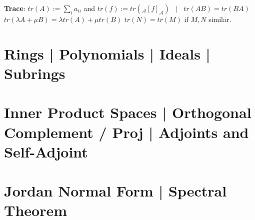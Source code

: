 \documentclass[9pt]{article}
\begin{document}
\textbf{Trace}: $tr(A):=\sum_{i}a_{ii}$ and $tr(f):=tr(_{\mathcal{A}}[f]_{\mathcal{A}})$ \ $\big|$ \ {\small $tr(AB)=tr(BA)$ \quad $tr(\lambda A+\mu B)=\lambda tr(A)+\mu tr(B)$ \quad $tr(N)=tr(M)$ if $M,N$ similar.}


\section{Rings | Polynomials | Ideals | Subrings}


\section{Inner Product Spaces | Orthogonal Complement / Proj | Adjoints and Self-Adjoint}


\section{Jordan Normal Form | Spectral Theorem}
\end{document}
